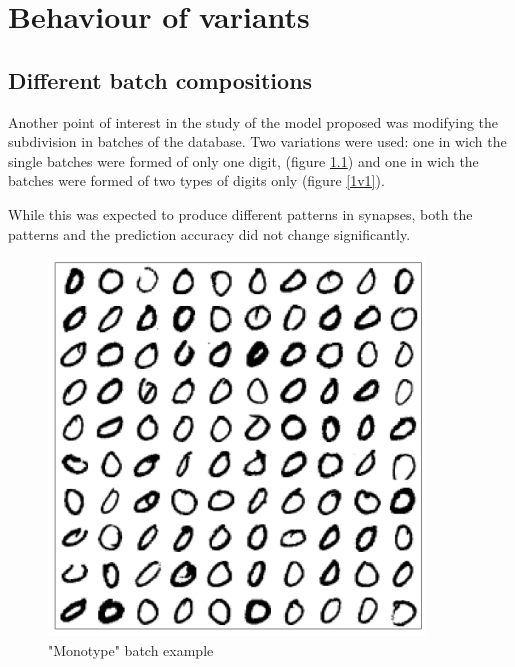 \documentclass[a4paper]{report}
\begin{document}
\chapter{Behaviour of variants}

\section{Different batch compositions}

Another point of interest in the study of the model proposed was modifying the subdivision in batches of the database. Two variations were used: one in wich the single batches were formed of only one digit, (figure \ref{monotype}) and one in wich the batches were formed of two types of digits only (figure \ref{1v1}).

While this was expected to produce different patterns in synapses, both the patterns and the prediction accuracy did not change significantly.

\begin{figure} [H]
    \centering
    \includegraphics [width=10cm ] {o/0.png}
    \caption{"Monotype" batch example}
    \label{monotype}
\end{figure}
\end{document}

